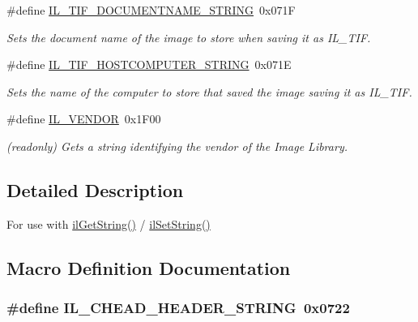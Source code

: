 \begin{DoxyCompactItemize}
\#define \hyperlink{group__il__strings_gab5f502877d6992abfc3705557d58c2db}{I\+L\+\_\+\+T\+I\+F\+\_\+\+D\+O\+C\+U\+M\+E\+N\+T\+N\+A\+M\+E\+\_\+\+S\+T\+R\+I\+N\+G}~0x071\+F
\begin{DoxyCompactList}\small\item\em Sets the document name of the image to store when saving it as I\+L\+\_\+\+T\+I\+F. \end{DoxyCompactList}\item 
\#define \hyperlink{group__il__strings_gaef30a7987d61fc14c669c9708922fd69}{I\+L\+\_\+\+T\+I\+F\+\_\+\+H\+O\+S\+T\+C\+O\+M\+P\+U\+T\+E\+R\+\_\+\+S\+T\+R\+I\+N\+G}~0x071\+E
\begin{DoxyCompactList}\small\item\em Sets the name of the computer to store that saved the image saving it as I\+L\+\_\+\+T\+I\+F. \end{DoxyCompactList}\item 
\#define \hyperlink{group__il__strings_gabec68498a567cee901eb66c6ba7753e1}{I\+L\+\_\+\+V\+E\+N\+D\+O\+R}~0x1\+F00
\begin{DoxyCompactList}\small\item\em (readonly) Gets a string identifying the vendor of the Image Library. \end{DoxyCompactList}\end{DoxyCompactItemize}


\subsection{Detailed Description}
For use with \hyperlink{group__state_ga29fd50e44b7e69435d64f82613438e4f}{il\+Get\+String()} / \hyperlink{group__state_ga9a4eb898282d4a5cdecc6303bca20814}{il\+Set\+String()} 



\subsection{Macro Definition Documentation}
\hypertarget{group__il__strings_gac9085152fa2bb0125a76f30726d7f264}{
\subsubsection[{I\+L\+\_\+\+C\+H\+E\+A\+D\+\_\+\+H\+E\+A\+D\+E\+R\+\_\+\+S\+T\+R\+I\+N\+G}]{\setlength{\rightskip}{0pt plus 5cm}\#define I\+L\+\_\+\+C\+H\+E\+A\+D\+\_\+\+H\+E\+A\+D\+E\+R\+\_\+\+S\+T\+R\+I\+N\+G~0x0722}}\label{group__il__strings_gac9085152fa2bb0125a76f30726d7f264}


